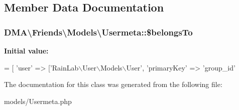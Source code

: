 \subsection{Member Data Documentation}
\hypertarget{classDMA_1_1Friends_1_1Models_1_1Usermeta_a93ae6777a48086374de412273d1d092e}{
\subsubsection[{\$belongs\+To}]{\setlength{\rightskip}{0pt plus 5cm}D\+M\+A\textbackslash{}\+Friends\textbackslash{}\+Models\textbackslash{}\+Usermeta\+::\$belongs\+To}}\label{classDMA_1_1Friends_1_1Models_1_1Usermeta_a93ae6777a48086374de412273d1d092e}
{\bfseries Initial value\+:}
\begin{DoxyCode}
= [
        \textcolor{stringliteral}{'user'}          => [\textcolor{stringliteral}{'RainLab\(\backslash\)User\(\backslash\)Models\(\backslash\)User'},
            \textcolor{stringliteral}{'primaryKey'}    => \textcolor{stringliteral}{'group\_id'}
\end{DoxyCode}


The documentation for this class was generated from the following file\+:\begin{DoxyCompactItemize}
\item 
models/Usermeta.\+php\end{DoxyCompactItemize}
